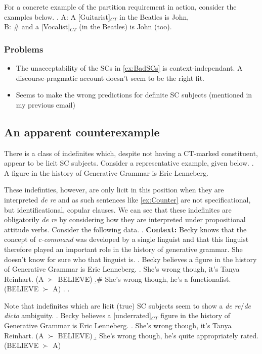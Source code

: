 \documentclass[letterpaper]{article}
\begin{document}
For a concrete example of the partition requirement in action, consider the examples below.
\ex. A: A [Guitarist]$_{CT}$ in the Beatles is John,\\
B: \# and a [Vocalist]$_{CT}$ (in the Beatles) is John (too).

\subsubsection{Problems}
\begin{itemize}
  \item The unacceptability of the SCs in \ref{ex:BadSCs} is context-independant. 
    A discourse-pragmatic account doesn't seem to be the right fit.
  \item Seems to make the wrong predictions for definite SC subjects (mentioned in my previous email)
\end{itemize}
\subsection{An apparent counterexample}
There is a class of indefinites which, despite not having a CT-marked constituent, appear to be licit SC subjects.
Consider a  representative example, given below.
\ex.\label{ex:Counter} A figure in the history of Generative Grammar is Eric Lenneberg.

These indefinties, however, are only licit in this position when they are interpreted \textit{de re} and as such sentences like \ref{ex:Counter} are not specificational, but identificational, copular clauses.
We can see that these indefinites are obligatorily \textit{de re} by considering how they are interpreted under propositional attitude verbs.
Consider the following data.
\ex. \textbf{Context:} Becky knows that the concept of \textit{c-command} was developed by a single linguist and that this linguist therefore played an important role in the history of generative grammar.
She doesn't know for sure who that linguist is.
	\a. Becky believes a figure in the history of Generative Grammar is Eric Lenneberg.
		\a. She's wrong though, it's Tanya Reinhart. (A $\succ$ BELIEVE)
		\b.\# She's wrong though, he's a functionalist. (BELIEVE $\succ$ A)
		\z.
	\z.

Note that indefinites which are licit (true) SC subjects seem to show a \textit{de re}/\textit{de dicto} ambiguity.
\ex. Becky believes a [underrated]$_{CT}$ figure in the history of Generative Grammar is Eric Lenneberg.
	\a. She's wrong though, it's Tanya Reinhart. (A $\succ$ BELIEVE)
	\b. She's wrong though, he's quite appropriately rated. (BELIEVE $\succ$ A)
\end{document}
